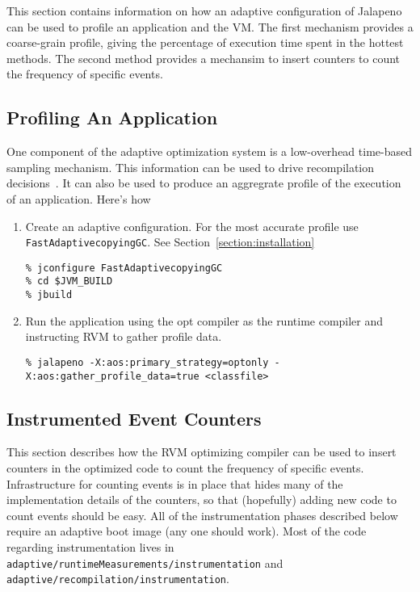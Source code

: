 This section contains information on how an adaptive configuration of
Jalapeno can be used to profile an application and the VM.  The first
mechanism provides a coarse-grain profile, giving the percentage of
execution time spent in the hottest methods.  The second method
provides a mechansim to insert counters to count the frequency of 
specific events. 

\subsection{Profiling An Application}
One component of the adaptive optimization system is a low-overhead
time-based sampling mechanism.  This information can be used to drive
recompilation decisions\T~\cite{jalapeno-adaptive-00}.
It can also be used to produce an aggregrate
profile of the execution of an application.  
Here's how 

\begin{enumerate}
\item Create an adaptive configuration.  For the most accurate profile use
{\tt FastAdaptivecopyingGC}.  See Section~\ref{section:installation}
\begin{verbatim}
% jconfigure FastAdaptivecopyingGC
% cd $JVM_BUILD
% jbuild
\end{verbatim}

\item Run the application using the opt compiler as the runtime compiler and
instructing RVM to gather profile data.
\begin{verbatim}
% jalapeno -X:aos:primary_strategy=optonly -X:aos:gather_profile_data=true <classfile>
\end{verbatim}
\end{enumerate}

\subsection{Instrumented Event Counters}
\label{counting_events}
This section describes how the RVM optimizing compiler can be used to
insert counters in the optimized code to count the frequency of
specific events.  Infrastructure for counting events is in place that
hides many of the implementation details of the counters, so that
(hopefully) adding new code to count events should be easy.  All of
the instrumentation phases described below require an adaptive boot
image (any one should work).  Most of the code regarding
instrumentation lives in {\tt
adaptive/runtimeMeasurements/instrumentation} and {\tt
adaptive/recompilation/instrumentation}.

